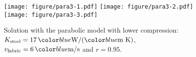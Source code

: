 \begin{figure}[H]
  \begin{center}
    \texttt{[image: figure/para3-1.pdf]}
    \texttt{[image: figure/para3-2.pdf]}
    \texttt{[image: figure/para3-3.pdf]}
  \end{center}
  \caption{Solution with the parabolic model with lower compression:
  $\Ksteel=17\,\unit{W}/(\unit{m K})$, $\VT=6\,\unit{m/s}$ and  $r=0.95$.}
  \label{fig:para3}
\end{figure}





